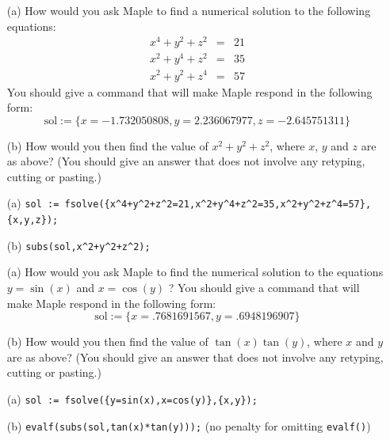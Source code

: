 \documentclass[a4paper]{article}
\begin{document}
\begin{problem}
 \begin{itemize}
  \item[(a)] How would you ask Maple to find a numerical
   solution to the following equations:
   \begin{eqnarray*}
    x^4+y^2+z^2 &=& 21\\
    x^2+y^4+z^2 &=& 35\\
    x^2+y^2+z^4 &=& 57
   \end{eqnarray*}
   You should give a command that will make Maple respond in
   the following form:
   \[ \mbox{sol} :=
       \{x = -1.732050808, y = 2.236067977, z = -2.645751311\}
   \]
  \item[(b)] How would you then find the value of
   $x^2+y^2+z^2$, where $x$, $y$ and $z$ are as above?  (You
   should give an answer that does not involve any retyping,
   cutting or pasting.) 
 \end{itemize}
\end{problem}
\begin{solution}
 \begin{itemize}
  \item[(a)]
   \verb~sol := fsolve({x^4+y^2+z^2=21,x^2+y^4+z^2=35,x^2+y^2+z^4=57},{x,y,z});~
  \item[(b)]
   \verb~subs(sol,x^2+y^2+z^2);~ 
 \end{itemize}
\end{solution}



\begin{problem}
 \begin{itemize}
  \item[(a)] How would you ask Maple to find the numerical
   solution to the equations $y=\sin(x)$ and $x=\cos(y)$ ? 
   You should give a command that will make Maple respond in
   the following form:
   \[ \mbox{sol} := \{x = .7681691567, y = .6948196907\} \]
  \item[(b)] How would you then find the value of
   $\tan(x)\tan(y)$, where $x$ and $y$ are as above?  (You
   should give an answer that does not involve any retyping,
   cutting or pasting.) 
 \end{itemize}
\end{problem}
\begin{solution}
 \begin{itemize}
  \item[(a)]
   \verb~sol := fsolve({y=sin(x),x=cos(y)},{x,y});~ 
  \item[(b)]
   \verb~evalf(subs(sol,tan(x)*tan(y)));~ 
   (no penalty for omitting \verb~evalf()~) 
 \end{itemize}
\end{solution}
\end{document}
